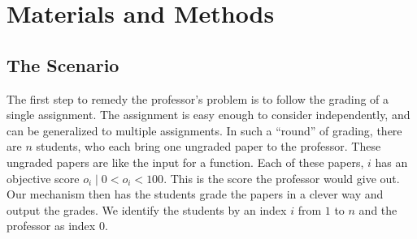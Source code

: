 \documentclass[12pt, Arial]{article}
\begin{document}
\section{Materials and Methods}
\subsection{The Scenario}
The first step to remedy the professor's problem is to follow the grading of a single assignment. The assignment is easy enough to consider independently, and can be generalized to multiple assignments. In such a ``round'' of grading, there are $n$ students, who each bring one ungraded paper to the professor. These ungraded papers are like the input for a function. Each of these papers, $i$ has an objective score $o_i\mid 0<o_i<100$. This is the score the professor would give out. Our mechanism then has the students grade the papers in a clever way and output the grades. We identify the students by an index $i$ from $1$ to $n$ and the professor as index $0$.
\end{document}
